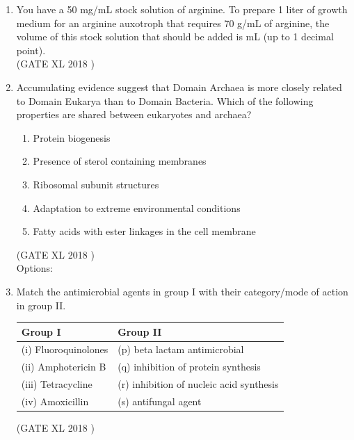 \documentclass[14pt]{extarticle}
\begin{document}
\begin{flushleft}
\begin{enumerate}
\item You have a 50 mg/mL stock solution of arginine. To prepare 1 liter of growth medium for an arginine auxotroph that requires 70 \textmu g/mL of arginine, the volume of this stock solution that should be added is \underline{\hspace{4cm}} mL (up to 1 decimal point).\\
\hfill(GATE XL 2018 )\\

\item Accumulating evidence suggest that Domain Archaea is more closely related to Domain Eukarya than to Domain Bacteria. Which of the following properties are shared between eukaryotes and archaea?
\begin{enumerate}[label=(\roman*)]
  \item Protein biogenesis
  \item Presence of sterol containing membranes
  \item Ribosomal subunit structures
  \item Adaptation to extreme environmental conditions
  \item Fatty acids with ester linkages in the cell membrane
\end{enumerate}
\hfill(GATE XL 2018 )\\
Options:
\begin{enumerate}[label=(\Alph*)]
\end{enumerate}

\item Match the antimicrobial agents in group I with their category/mode of action in group II.  

\begin{tabular}{|l|l|}
\hline
\textbf{Group I} & \textbf{Group II} \\ \hline
(i) Fluoroquinolones & (p) beta lactam antimicrobial \\
(ii) Amphotericin B & (q) inhibition of protein synthesis \\
(iii) Tetracycline & (r) inhibition of nucleic acid synthesis \\
(iv) Amoxicillin & (s) antifungal agent \\ \hline
\end{tabular}
\hfill(GATE XL 2018 )\\


\end{enumerate}
\end{flushleft}
\end{document}
